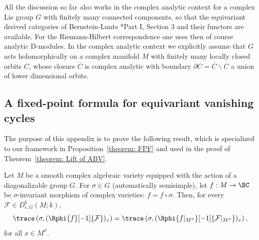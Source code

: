 \documentclass[11pt,letterpaper]{amsart}
\numberwithin{equation}{section}
\begin{document}
\begin{remark}
All the discussion so far also works in the complex analytic context for a complex Lie group $G$ with finitely many connected components,
so that the equivariant derived categories of 
Bernstein-Lunts \cite{BL94}*{Part I, Section 3}
and their functors are available. 
For the Riemann-Hilbert correspondence one uses then of course analytic D-modules.
In the complex analytic context we explicitly assume that $G$ acts holomorphically on a complex manifold $M$ with finitely many locally closed orbits $C$, whose closure $\overline{C}$ is complex analytic with boundary
$\partial{C}= \overline{C}\backslash C$ a union of lower dimensional orbits.
\end{remark}

\subsection{A fixed-point formula for equivariant vanishing cycles}\label{subsection: FPF for Ev}

The purpose of this appendix is to prove the following result, which is specialized to our framework in Proposition~\ref{theorem: FPF} and used in the proof of Theorem~\ref{theorem: Lift of ABV}.

\begin{theorem}\label{theorem: Schurmann}
Let $M$ be a smooth complex algebraic variety equipped with the action of a diagonalizable group $G$. 
For $\sigma\in G$ (automatically semisimple), let $f: M\to \BC$ be $\sigma$-invariant morphism of complex varieties: $f =f\circ \sigma$.
Then, for every $\mathcal{F}\in D^b_{c,G}(M;k)$,
\begin{equation}\label{trace-van-alg}
\trace\left(\sigma, (\Rphi{f}[-1]{ \mathcal{F}})_x \right)
=
\trace\left(\sigma, (\Rphi{f\vert_{M^\sigma}}[-1]{ \mathcal{F}\vert_{M^\sigma}})_x \right),
\end{equation}
for all $x\in M^\sigma$.
\end{theorem}
\end{document}
